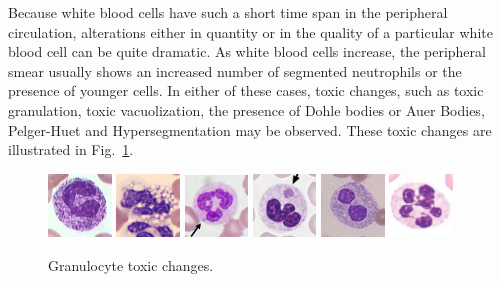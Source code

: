 \documentclass[final,a4paper,12pt,english]{UnicaPhdThesis3}
\begin{document}
{Because white blood cells have such a short time span in the peripheral circulation, alterations either in quantity or in the quality of a particular white blood cell can be quite dramatic. As white blood cells increase, the peripheral smear usually shows an increased number of segmented neutrophils or the presence of younger cells. In either of these cases, toxic changes, such as toxic granulation, toxic vacuolization, the presence of Dohle bodies or Auer Bodies, Pelger-Huet and Hypersegmentation may be observed. These toxic changes are illustrated in Fig.~\ref{fig:Changes}.


\begin{figure}[!htbp]
\centering
\includegraphics[width=0.15\textwidth]{images/granul}
\includegraphics[width=0.15\textwidth]{images/vacuol}
\includegraphics[width=0.15\textwidth]{images/Dohle}
\includegraphics[width=0.15\textwidth]{images/Auer}
\includegraphics[width=0.15\textwidth]{images/Pelger}
\includegraphics[width=0.15\textwidth]{images/hyper}
\caption{\label{fig:Changes} Granulocyte toxic changes.}
\end{figure}

}
\end{document}

